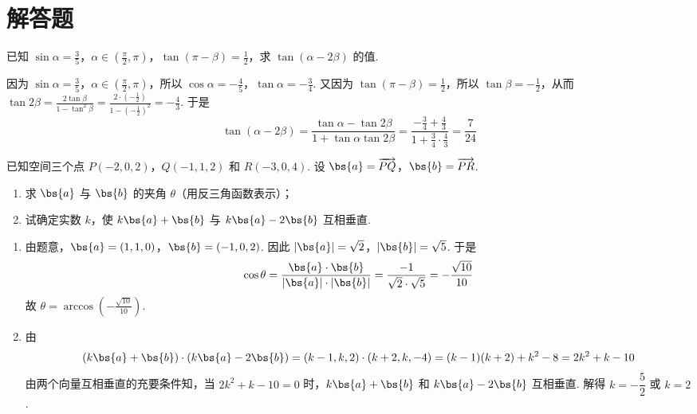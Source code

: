\section{解答题}

\begin{problem}
已知 \(\sin \alpha = \frac{3}{5}\)，\(\alpha \in \left(\frac{\pi}{2}, \pi\right)\)，\(\tan(\pi - \beta) = \frac{1}{2}\)，求 \(\tan(\alpha - 2\beta)\) 的值.
\end{problem}

\begin{solution}
因为 \(\sin \alpha = \frac{3}{5}\)，\(\alpha \in \left(\frac{\pi}{2}, \pi\right)\)，所以 \(\cos \alpha = -\frac{4}{5}\)，\(\tan \alpha = -\frac{3}{4}\).
又因为 \(\tan(\pi - \beta) = \frac{1}{2}\)，所以 \(\tan \beta = -\frac{1}{2}\)，从而
\(\tan 2\beta = \frac{2\tan \beta}{1 - \tan^2 \beta} = \frac{2 \cdot \left(-\frac{1}{2}\right)}{1 - \left(-\frac{1}{2}\right)^2} = -\frac{4}{3}\).
于是
\[
\tan(\alpha - 2\beta)
= \frac{\tan \alpha - \tan 2\beta}{1 + \tan \alpha \tan 2\beta}
= \frac{-\frac{3}{4} + \frac{4}{3}}{1 + \frac{3}{4} \cdot \frac{4}{3}}
= \frac{7}{24}
\]
\end{solution}

\begin{problem}
已知空间三个点 \(P(-2,0,2)\)，\(Q(-1,1,2)\) 和 \(R(-3,0,4)\). 设 \(\bs{a} = \overrightarrow{PQ}\)，\(\bs{b} = \overrightarrow{PR}\).

\begin{enumerate}
\item 求 \(\bs{a}\) 与 \(\bs{b}\) 的夹角 \(\theta\)（用反三角函数表示）；
\item 试确定实数 \(k\)，使 \(k\bs{a} + \bs{b}\) 与 \(k\bs{a} - 2\bs{b}\) 互相垂直.
\end{enumerate}
\end{problem}

\begin{solution}
\begin{enumerate}
\item 由题意，\(\bs{a} = (1,1,0)\)，\(\bs{b} = (-1,0,2)\).
因此 \(|\bs{a}| = \sqrt{2}\)，\(|\bs{b}| = \sqrt{5}\).
于是
\[
\cos \theta
= \frac{\bs{a} \cdot \bs{b}}{|\bs{a}| \cdot |\bs{b}|}
= \frac{-1}{\sqrt{2} \cdot \sqrt{5}}
= -\frac{\sqrt{10}}{10}
\]
故 \(\theta = \arccos\left(-\frac{\sqrt{10}}{10}\right)\).

\item 由
\[
(k\bs{a} + \bs{b}) \cdot (k\bs{a} - 2\bs{b})
    = (k - 1,k,2) \cdot (k + 2,k,-4)
    = (k - 1)(k + 2) + k^2 - 8
= 2k^2 + k - 10
\]
由两个向量互相垂直的充要条件知，当 \(2k^2 + k - 10 = 0\) 时，\(k\bs{a} + \bs{b}\) 和 \(k\bs{a} - 2\bs{b}\) 互相垂直. 解得 \(k = -\dfrac{5}{2}\) 或 \(k = 2\).
\end{enumerate}
\end{solution}

